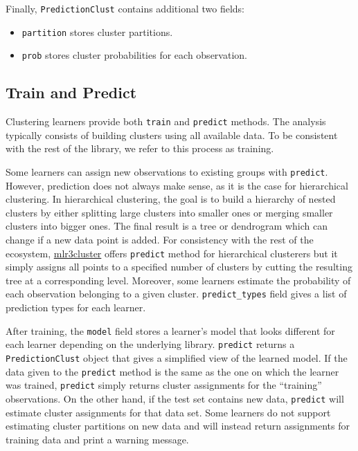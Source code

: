 \documentclass[
]{scrbook}
\providecommand{\tightlist}{%
  \setlength{\itemsep}{0pt}\setlength{\parskip}{0pt}}
\begin{document}
Finally, \texttt{PredictionClust} contains additional two fields:

\begin{itemize}
\tightlist
\item
  \texttt{partition} stores cluster partitions.
\item
  \texttt{prob} stores cluster probabilities for each observation.
\end{itemize}

\hypertarget{train-and-predict-2}{%
\subsection{Train and Predict}\label{train-and-predict-2}}

Clustering learners provide both \texttt{train} and \texttt{predict} methods.
The analysis typically consists of building clusters using all available data.
To be consistent with the rest of the library, we refer to this process as training.

Some learners can assign new observations to existing groups with \texttt{predict}.
However, prediction does not always make sense, as it is the case for hierarchical clustering.
In hierarchical clustering, the goal is to build a hierarchy of nested clusters by either splitting large clusters into smaller ones or merging smaller clusters into bigger ones.
The final result is a tree or dendrogram which can change if a new data point is added.
For consistency with the rest of the ecosystem, \href{https://mlr3cluster.mlr-org.com}{mlr3cluster} offers \texttt{predict} method for hierarchical clusterers but it simply assigns all points to a specified number of clusters by cutting the resulting tree at a corresponding level.
Moreover, some learners estimate the probability of each observation belonging to a given cluster.
\texttt{predict\_types} field gives a list of prediction types for each learner.

After training, the \texttt{model} field stores a learner's model that looks different for each learner depending on the underlying library.
\texttt{predict} returns a \texttt{PredictionClust} object that gives a simplified view of the learned model.
If the data given to the \texttt{predict} method is the same as the one on which the learner was trained, \texttt{predict} simply returns cluster assignments for the ``training'' observations.
On the other hand, if the test set contains new data, \texttt{predict} will estimate cluster assignments for that data set.
Some learners do not support estimating cluster partitions on new data and will instead return assignments for training data and print a warning message.
\end{document}

